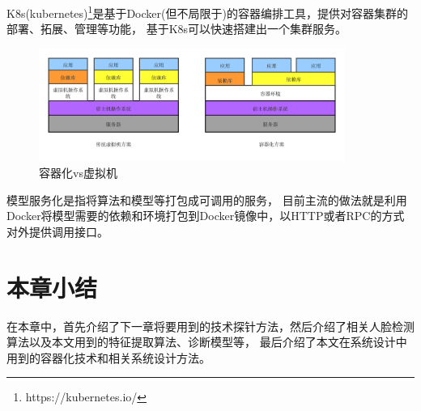 K8s(kubernetes)\footnote{https://kubernetes.io/}是基于Docker(但不局限于)的容器编排工具，提供对容器集群的部署、拓展、管理等功能，
基于K8s可以快速搭建出一个集群服务。

\begin{figure}
    \centering
    \includegraphics[width=10cm]{images/container.png}
    \caption{容器化vs虚拟机}
    \label{fig:container}
\end{figure}

模型服务化是指将算法和模型等打包成可调用的服务，
目前主流的做法就是利用Docker将模型需要的依赖和环境打包到Docker镜像中，以HTTP或者RPC的方式对外提供调用接口。

\section{本章小结}
在本章中，首先介绍了下一章将要用到的技术探针方法，然后介绍了相关人脸检测算法以及本文用到的特征提取算法、诊断模型等，
最后介绍了本文在系统设计中用到的容器化技术和相关系统设计方法。